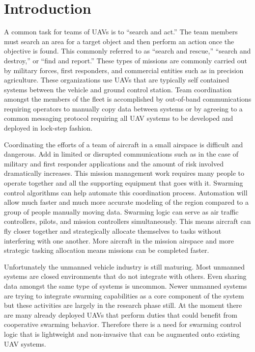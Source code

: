 \chapter{Introduction}
A common task for teams of UAVs is to ``search and act.''  The team members must search an area for a target object and then perform an action once the objective is found.  This commonly referred to as ``search and rescue,'' ``search and destroy,'' or ``find and report.''  These types of missions are commonly carried out by military forces, first responders, and commercial entities such as in precision agriculture.  These organizations use UAVs that are typically self contained systems between the vehicle and ground control station.  Team coordination amongst the members of the fleet is accomplished by out-of-band communications requiring operators to manually copy data between systems or by agreeing to a common messaging protocol requiring all UAV systems to be developed and deployed in lock-step fashion.  

Coordinating the efforts of a team of aircraft in a small airspace is difficult and dangerous.  Add in limited or disrupted communications such as in the case of military and first responder applications and the amount of risk involved dramatically increases.  This mission management work requires many people to operate together and all the supporting equipment that goes with it. Swarming control algorithms can help automate this coordination process.  Automation will allow much faster and much more accurate modeling of the region compared to a group of people manually moving data.  Swarming logic can serve as air traffic controllers, pilots, and mission controllers simultaneously.  This means aircraft can fly closer together and strategically allocate themselves to tasks without interfering with one another.  More aircraft in the mission airspace and more strategic tasking allocation means missions can be completed faster.

Unfortunately the unmanned vehicle industry is still maturing.  Most unmanned systems are closed environments that do not integrate with others.  Even sharing data amongst the same type of systems is uncommon.  Newer unmanned systems are trying to integrate swarming capabilities as a core component of the system but these activities are largely in the research phase still.  At the moment there are many already deployed UAVs that perform duties that could benefit from cooperative swarming behavior.  Therefore there is a need for swarming control logic that is lightweight and non-invasive that can be augmented onto existing UAV systems.


